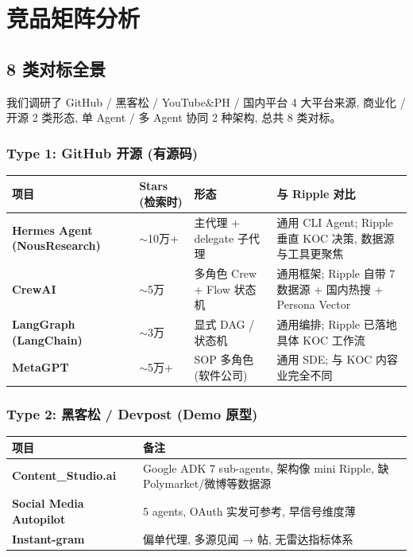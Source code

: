 \section{竞品矩阵分析}\label{sec:competitor}

\subsection{8 类对标全景}

我们调研了 GitHub / 黑客松 / YouTube\&PH / 国内平台 4 大平台来源, 商业化 / 开源 2 类形态, 单 Agent / 多 Agent 协同 2 种架构, 总共 8 类对标。

\subsubsection{Type 1: GitHub 开源 (有源码)}

\begin{tabularx}{\textwidth}{>{\bfseries}l l l X}
    \toprule
    项目 & Stars (检索时) & 形态 & 与 Ripple 对比 \\
    \midrule
    Hermes Agent (NousResearch) & $\sim$10万+ & 主代理 + delegate 子代理 & 通用 CLI Agent; Ripple 垂直 KOC 决策, 数据源与工具更聚焦 \\
    \midrule
    CrewAI & $\sim$5万 & 多角色 Crew + Flow 状态机 & 通用框架; Ripple 自带 7 数据源 + 国内热搜 + Persona Vector \\
    \midrule
    LangGraph (LangChain) & $\sim$3万 & 显式 DAG / 状态机 & 通用编排; Ripple 已落地具体 KOC 工作流 \\
    \midrule
    MetaGPT & $\sim$5万+ & SOP 多角色 (软件公司) & 通用 SDE; 与 KOC 内容业完全不同 \\
    \bottomrule
\end{tabularx}

\subsubsection{Type 2: 黑客松 / Devpost (Demo 原型)}

\begin{tabularx}{\textwidth}{>{\bfseries}l X}
    \toprule
    项目 & 备注 \\
    \midrule
    Content\_Studio.ai & Google ADK 7 sub-agents, 架构像 mini Ripple, 缺 Polymarket/微博等数据源 \\
    \midrule
    Social Media Autopilot & 5 agents, OAuth 实发可参考, 早信号维度薄 \\
    \midrule
    Instant-gram & 偏单代理, 多源见闻 → 帖, 无雷达指标体系 \\
    \bottomrule
\end{tabularx}

